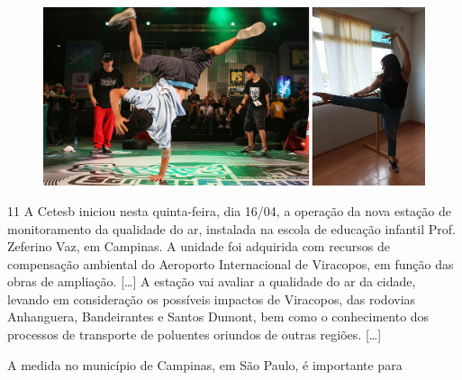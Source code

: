 \begin{figure}[htpb!]
\includegraphics[width=.7\textwidth]{./imgs/art35cd.png}
\end{figure}




%
%

\pagebreak
\num{11} A Cetesb iniciou nesta quinta-feira, dia 16/04, a operação da nova
estação de monitoramento da qualidade do ar, instalada na escola de
educação infantil Prof. Zeferino Vaz, em Campinas. A unidade foi
adquirida com recursos de compensação ambiental do Aeroporto
Internacional de Viracopos, em função das obras de ampliação. {[}\ldots{}{]} A estação
vai avaliar a qualidade do ar da cidade, levando em consideração os
possíveis impactos de Viracopos, das rodovias Anhanguera, Bandeirantes e
Santos Dumont, bem como o conhecimento dos processos de transporte de
poluentes oriundos de outras regiões. {[}\ldots{}{]}


A medida no município de Campinas, em São Paulo, é
importante para

